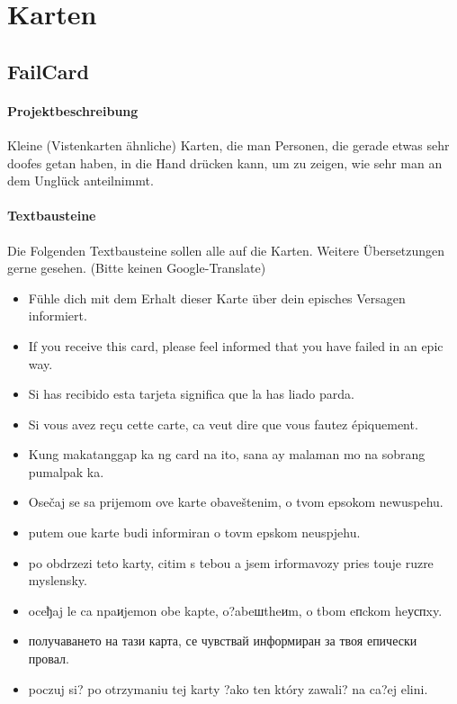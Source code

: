 \section{Karten}
\subsection{FailCard}
\paragraph{Projektbeschreibung} Kleine (Vistenkarten ähnliche) Karten, die man Personen, die gerade etwas sehr doofes getan haben, in die Hand drücken kann, um zu zeigen, wie sehr man an dem Unglück anteilnimmt.
\paragraph{Textbausteine}
Die Folgenden Textbausteine sollen alle auf die Karten. Weitere Übersetzungen gerne gesehen. (Bitte keinen Google-Translate)
\begin{itemize}
	\item Fühle dich mit dem Erhalt dieser Karte über dein episches Versagen informiert.
	\item If you receive this card, please feel informed that you have failed in an epic way.
	\item Si has recibido esta tarjeta significa que la has liado parda.
	\item Si vous avez reçu cette carte, ca veut dire que vous fautez épiquement.
	\item Kung makatanggap ka ng card na ito, sana ay malaman mo na sobrang pumalpak ka.
	\item Osečaj se sa prijemom ove karte obaveštenim, o tvom epsokom newuspehu.
	\item putem oue karte budi informiran o tovm epskom neuspjehu.
	\item po obdrzezi teto karty, citim s tebou a jsem irformavozy pries touje ruzre myslensky.
	\item \foreignlanguage{russian}{oceђaj le ca npaиjemon obe kapte, o?abeшtheиm, o tbom eпckom heуспxy.}
	\item \foreignlanguage{russian}{получаването на тази карта, се чувствай информиран за твоя епически провал.}
	\item \foreignlanguage{russian}{poczuj si? po otrzymaniu tej karty ?ako ten który zawali? na ca?ej elini.}
\end{itemize}


